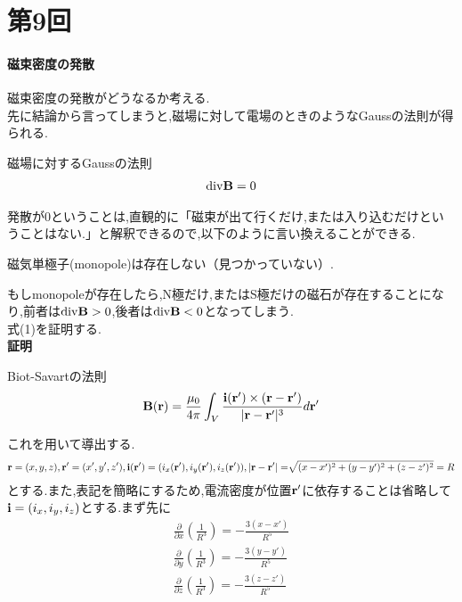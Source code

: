 \documentclass[../main]{subfiles}
\begin{document}
\clearpage

\setcounter{eqnarray}{0}
\setcounter{equation}{0}
\setcounter{figure}{0}

\part*{第9回}

\subsection{磁束密度の発散}
磁束密度の発散がどうなるか考える. \\
先に結論から言ってしまうと,磁場に対して電場のときのようなGaussの法則が得られる.
\begin{itembox}[c]{磁場に対するGaussの法則}
\begin{eqnarray}
{\rm div}{\bf B}=0
\end{eqnarray}
\end{itembox}
発散が0ということは,直観的に「磁束が出て行くだけ,または入り込むだけということはない.」と解釈できるので,以下のように言い換えることができる.
\begin{center}
磁気単極子(monopole)は存在しない（見つかっていない）.
\end{center}
もしmonopoleが存在したら,N極だけ,またはS極だけの磁石が存在することになり,前者は${\rm div}{\bf B}>0$,後者は${\rm div}{\bf B}<0$となってしまう. \\
式(1)を証明する. \\
{\bf 証明} \\
\begin{itembox}[c]{Biot-Savartの法則}
\begin{eqnarray}
{\bf B}({\bf r})=\frac{\mu_0}{4 \pi} \int_{V}^{}\frac{{\bf i}({\bf r'}) \times ({\bf r}-{\bf r'})}{|{\bf r}-{\bf r'}|^3} d{\bf r'}
\end{eqnarray}
\end{itembox}
これを用いて導出する.
\begin{eqnarray*}
{\bf r}=(x,y,z),{\bf r'}=(x',y',z'),{\bf i}({\bf r'})=(i_x({\bf r'}),i_y({\bf r'}),i_z({\bf r'})),|{\bf r}-{\bf r'}|=\sqrt[]{\mathstrut (x-x')^2+(y-y')^2+(z-z')^2}=R
\end{eqnarray*}
とする.また,表記を簡略にするため,電流密度が位置${\bf r'}$に依存することは省略して${\bf i}=(i_x,i_y,i_z)$とする.まず先に
\begin{eqnarray*}
\frac{\partial}{\partial x} \left( \frac{1}{R^3} \right) = - \frac{3(x-x')}{R^5} \\
\frac{\partial}{\partial y} \left( \frac{1}{R^3} \right) = - \frac{3(y-y')}{R^5} \\
\frac{\partial}{\partial z} \left( \frac{1}{R^3} \right) = - \frac{3(z-z')}{R^5} \\
\end{eqnarray*}
\end{document}
